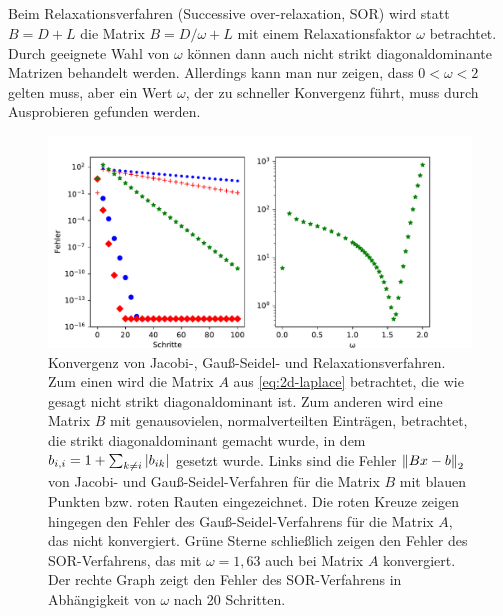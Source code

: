 \subsection{}

Beim Relaxationsverfahren (Successive over-relaxation, SOR) wird statt
$B = D + L$ die Matrix $B = D/\omega + L$ mit einem Relaxationsfaktor
$\omega$ betrachtet. Durch geeignete Wahl von $\omega$ können dann
auch nicht strikt diagonaldominante Matrizen behandelt
werden. Allerdings kann man nur zeigen, dass $0<\omega< 2$ gelten
muss, aber ein Wert $\omega$, der zu schneller Konvergenz führt, muss
durch Ausprobieren gefunden werden.

\begin{figure}
  \centering
  \includegraphics[width=\textwidth]{plots/iterative}
  \caption{Konvergenz von Jacobi-, Gauß-Seidel- und
    Relaxationsverfahren. Zum einen wird die Matrix $A$ aus
    \eqref{eq:2d-laplace} betrachtet, die wie gesagt nicht strikt
    diagonaldominant ist. Zum anderen wird eine Matrix $B$ mit
    genausovielen, normalverteilten Einträgen, betrachtet, die strikt
    diagonaldominant gemacht wurde, in dem $b_{i,i} = 1+ \sum_{k\neq
      i}\left\lvert{b_{ik}}\right\rvert$ gesetzt wurde. Links sind die Fehler
    $\left\lVert{Bx-b}\right\rVert_2$ von Jacobi- und Gauß-Seidel-Verfahren für die
    Matrix $B$ mit blauen Punkten bzw. roten Rauten eingezeichnet. Die
    roten Kreuze zeigen hingegen den Fehler des Gauß-Seidel-Verfahrens
    für die Matrix $A$, das nicht konvergiert. Grüne Sterne
    schließlich zeigen den Fehler des SOR-Verfahrens, das mit
    $\omega=1,63$ auch bei Matrix $A$ konvergiert. Der rechte Graph
    zeigt den Fehler des SOR-Verfahrens in Abhängigkeit von $\omega$
    nach 20 Schritten.}
  \label{fig:sor}
\end{figure}

